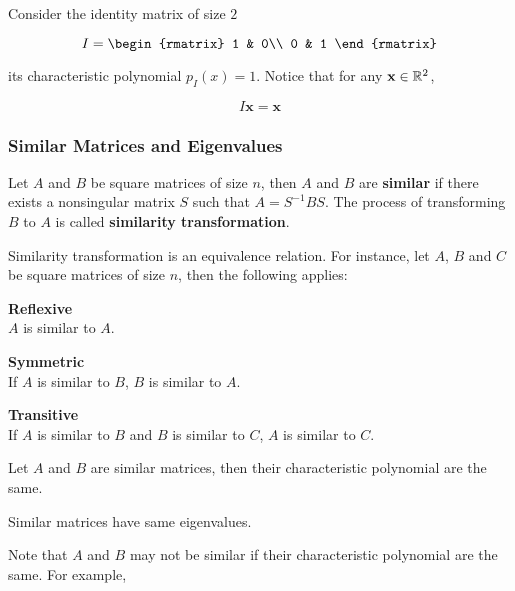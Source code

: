 \documentclass[a4paper,12pt]{article}
\begin{document}
\begin{exm}
  Consider the identity matrix of size $2$

  $$I=\begin{rmatrix}
    1 & 0\\
    0 & 1
  \end{rmatrix}$$\s

  its characteristic polynomial $p_{I}(x)=1$. Notice that for any $\mathbf{x}\in\mathbb{R}^{2}$,

  $$I\mathbf{x}=\mathbf{x}$$
\end{exm}\n

\subsubsection{Similar Matrices and Eigenvalues}
\begin{dft}
  Let $A$ and $B$ be square matrices of size $n$, then $A$ and $B$ are \textbf{similar} if there exists a nonsingular matrix $S$ such that $A=S^{-1}BS$. The process of transforming $B$ to $A$ is called \textbf{similarity transformation}.
\end{dft}\n

\begin{thm}
  Similarity transformation is an equivalence relation. For instance, let $A$, $B$ and $C$ be square matrices of size $n$, then the following applies:

  \begin{alist}
    \item \textbf{Reflexive}\\
    $A$ is similar to $A$.
    \item \textbf{Symmetric}\\
    If $A$ is similar to $B$, $B$ is similar to $A$.
    \item \textbf{Transitive}\\
    If $A$ is similar to $B$ and $B$ is similar to $C$, $A$ is similar to $C$.
  \end{alist}
\end{thm}\n

\begin{thm}
  Let $A$ and $B$ are similar matrices, then their characteristic polynomial are the same.
\end{thm}\n

\begin{crl}
  Similar matrices have same eigenvalues.
\end{crl}\n

Note that $A$ and $B$ may not be similar if their characteristic polynomial are the same. For example,
\end{document}
